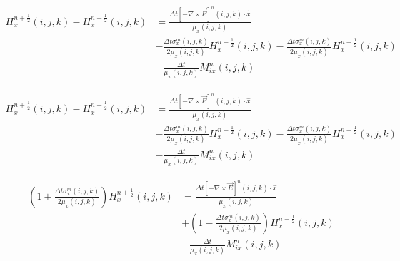 \documentclass[10pt]{article}
\begin{document}
\begin{equation}
	\begin{aligned}
		H^{n+\frac{1}{2}}_{x}(i,j,k) - H^{n-\frac{1}{2}}_{x}(i,j,k) & =
		\frac{\Delta t \left[ -\nabla\times \vec{E} \right]^{n}(i,j,k) \cdot \hat{x}}{\mu_{{x}}(i,j,k)}                                                                                                                                           \\
		                                                            & - \frac{\Delta t\sigma^{m}_{x}(i,j,k)}{2\mu_{x}(i,j,k)}  H^{n+\frac{1}{2}}_{x}(i,j,k)- \frac{\Delta t\sigma^{m}_{x}(i,j,k)}{2\mu_{x}(i,j,k)}   H^{n-\frac{1}{2}}_{x}(i,j,k) \\
		                                                            & - \frac{\Delta t}{\mu_{x}(i,j,k)} M^{n}_{ix}(i,j,k)
	\end{aligned}
\end{equation}

\begin{equation}
	\begin{aligned}
		H^{n+\frac{1}{2}}_{x}(i,j,k) - H^{n-\frac{1}{2}}_{x}(i,j,k) & =
		\frac{\Delta t \left[ -\nabla\times \vec{E} \right]^{n}(i,j,k) \cdot \hat{x}}{\mu_{{x}}(i,j,k)}                                                                                                                                             \\
		                                                            & - \frac{\Delta t \sigma^{m}_{x}(i,j,k)}{2\mu_{x}(i,j,k)}  H^{n+\frac{1}{2}}_{x}(i,j,k)- \frac{\Delta t \sigma^{m}_{x}(i,j,k)}{2\mu_{x}(i,j,k)}   H^{n-\frac{1}{2}}_{x}(i,j,k) \\
		                                                            & - \frac{\Delta t}{\mu_{x}(i,j,k)} M^{n}_{ix}(i,j,k)
	\end{aligned}
\end{equation}

\begin{equation}
	\begin{aligned}
		\left(1 + \frac{\Delta t \sigma^{m}_{x}(i,j,k)}{2\mu_{x}(i,j,k)} \right) H^{n+\frac{1}{2}}_{x}(i,j,k) & =
		\frac{\Delta t \left[ -\nabla\times \vec{E} \right]^{n}(i,j,k) \cdot \hat{x}}{\mu_{{x}}(i,j,k)}                                                                                                                    \\
		                                                                                                      & + \left( 1 - \frac{\Delta t \sigma^{m}_{x}(i,j,k)}{2\mu_{x}(i,j,k)} \right)   H^{n-\frac{1}{2}}_{x}(i,j,k) \\
		                                                                                                      & - \frac{\Delta t}{\mu_{x}(i,j,k)} M^{n}_{ix}(i,j,k)
	\end{aligned}
\end{equation}
\end{document}

